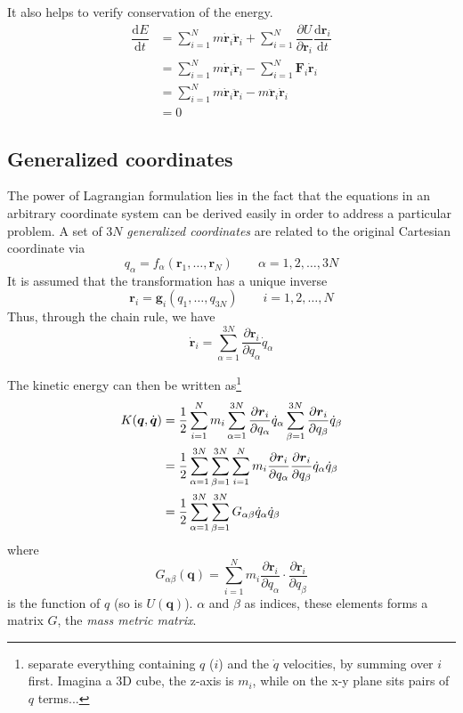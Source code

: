 \documentclass[
  10pt,
  twoside,
  openany,
  b5paper, %
  colorscheme = bootstrap-v4, %
]{qyxf-book}
\numberwithin{equation}{section}
\newcommand{\md}{\mathrm{d}}
\newcommand{\der}[2]{\dfrac{\md #1}{\md #2}}
\newcommand{\p}[2]{\dfrac{\partial #1}{\partial #2}}
\newcommand{\vF}{\boldsymbol{F}}
\newcommand{\vr}{\boldsymbol{r}}
\newcommand{\vq}{\boldsymbol{q}}
\newcommand{\dvr}{\dot{\vr}}
\newcommand{\ddvr}{\ddot{\vr}}
\newcommand{\dvq}{\dot{\vq}}
\newcommand{\half}{\dfrac{1}{2}}
\newcommand{\sumin}{\sum_{i=1}^N}
\newcommand{\suman}{\sum_{\alpha=1}^{3N}}
\begin{document}
It also helps to verify conservation of the energy.
\begin{align*}
	\der{E}{t}&=\sumin m\dvr_i\ddvr_i+\sumin\p{U}{\vr_i}\der{\vr_i}{t}\\
	&=\sumin m\dvr_i\ddvr_i-\sumin\vF_i\dvr_i\\
	&=\sumin m\dvr_i\ddvr_i-m\ddvr_i\dvr_i\\
	&=0
\end{align*}

\subsection{Generalized coordinates}
The power of Lagrangian formulation lies in the fact that the equations in an arbitrary coordinate system can be derived easily in order to address a particular problem. A set of $3N$ \textit{generalized coordinates} are related to the original Cartesian coordinate via
\begin{equation}
	q_\alpha = f_\alpha(\vr_1,\dots,\vr_N)\qquad \alpha=1,2,\dots,3N
\end{equation}
It is assumed that the transformation has a unique inverse
\begin{equation}
	\vr_i=\boldsymbol{g}_i(q_1,\dots,q_{3N})\qquad i=1,2,\dots,N
\end{equation}
Thus, through the chain rule, we have
\begin{equation}
	\dvr_i=\suman\p{\vr_i}{q_\alpha}\dot{q}_\alpha
\end{equation}

The kinetic energy can then be written as\footnote{separate everything containing $q$ ($i$) and the $\dot{q}$ velocities, by summing over $i$ first. Imagina a 3D cube, the z-axis is $m_i$, while on the x-y plane sits pairs of $q$ terms...}
\begin{align}\label{eq:kinetic-energy}
	K(\vq,\dvq)&=\half\sumin m_i\suman\p{\vr_i}{q_\alpha}\dot{q}_\alpha\sum_{\beta=1}^{3N}\p{\vr_i}{q_\beta}\dot{q}_\beta \notag\\
	&=\half\suman\sum_{\beta=1}^{3N}\sumin m_i\p{\vr_i}{q_\alpha}\p{\vr_i}{q_\beta}\dot{q}_\alpha\dot{q}_\beta \notag\\
	&=\half\suman\sum_{\beta=1}^{3N}G_{\alpha\beta}\dot{q}_\alpha\dot{q}_\beta
\end{align}
where
\begin{equation}
	G_{\alpha\beta}(\vq)=\sumin m_i\p{\vr_i}{q_\alpha}\cdot\p{\vr_i}{q_\beta}
\end{equation}
is the function of $q$ (so is $U(\vq)$). $\alpha$ and $\beta$ as indices, these elements forms a matrix $G$, the \textit{mass metric matrix}. 
\end{document}
